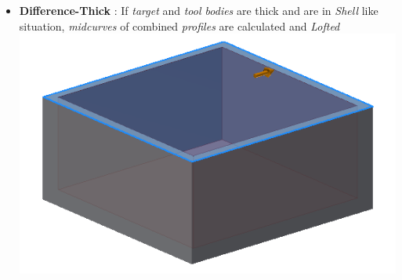\begin{itemize}[noitemsep,topsep=2pt,parsep=2pt,partopsep=2pt,label={},leftmargin=*]
\item {\bf Difference-Thick} : If {\em target} and {\em tool bodies} are thick and are in {\em Shell} like situation, {\em midcurves} of combined {\em profiles} are calculated and {\em Lofted}  
\includegraphics[scale=0.32]{../Common/images//Midsurf_diffthick.png}
\end{itemize}

%
%
%
%
%
%





